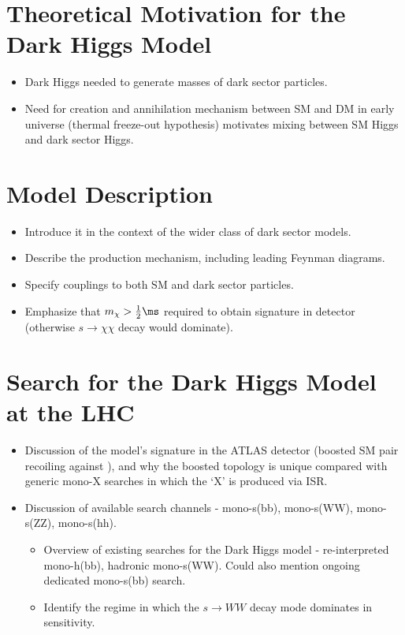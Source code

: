 \label{chapter:dh_model}

\section{Theoretical Motivation for the Dark Higgs Model}
\begin{itemize}
\item Dark Higgs needed to generate masses of dark sector particles.
\item Need for creation and annihilation mechanism between SM and DM in early universe (thermal freeze-out hypothesis) motivates mixing between SM Higgs and dark sector Higgs.
\end{itemize}

\section{Model Description}
\begin{itemize}
\item Introduce it in the context of the wider class of dark sector models.
\item Describe the production mechanism, including leading Feynman diagrams.
\item Specify couplings to both SM and dark sector particles. 
\item Emphasize that $m_\chi>\frac{1}{2}\ms$ required to obtain signature in detector (otherwise $s\rightarrow\chi\chi$ decay would dominate).
\end{itemize}

\section{Search for the Dark Higgs Model at the LHC}

\begin{itemize}
\item Discussion of the model's signature in the ATLAS detector (boosted SM pair recoiling against \met), and why the boosted topology is unique compared with generic mono-X searches in which the `X' is produced via ISR.
\item Discussion of available search channels - mono-s(bb), mono-s(WW), mono-s(ZZ), mono-s(hh).
\begin{itemize}
\item Overview of existing searches for the Dark Higgs model - re-interpreted mono-h(bb), hadronic mono-s(WW). Could also mention ongoing dedicated mono-s(bb) search.
\item Identify the \ms regime in which the $s\rightarrow WW$ decay mode dominates in sensitivity.
\end{itemize}
\end{itemize}